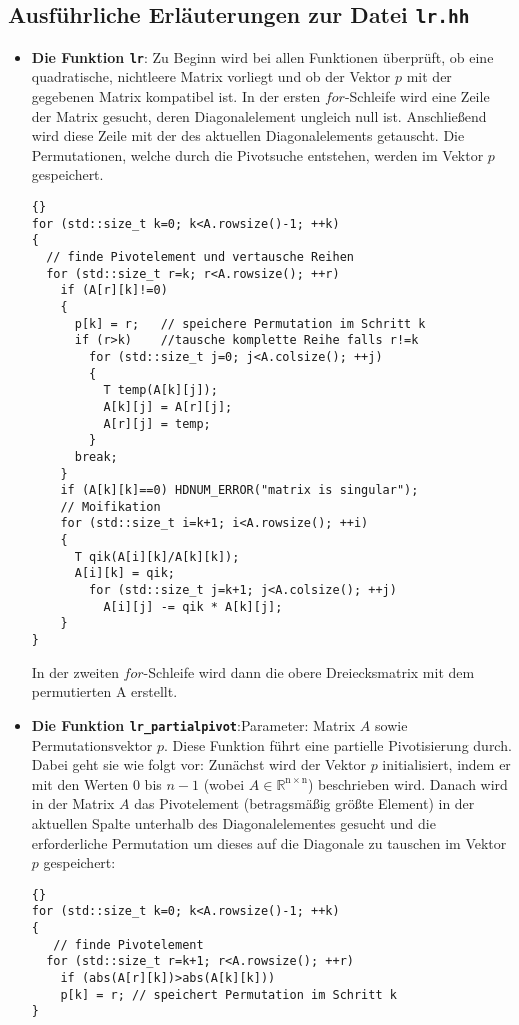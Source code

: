 \documentclass[a4paper,11pt]{article}
\theoremstyle{definition}
\begin{document}
\subsection{Ausführliche Erläuterungen zur Datei \lstinline{lr.hh}}
\begin{itemize}
\item \textbf{Die Funktion \lstinline{lr}}: Zu Beginn wird bei allen
  Funktionen überprüft, ob eine quadratische, nichtleere Matrix
  vorliegt und ob der Vektor $p$ mit der gegebenen Matrix kompatibel
  ist.  In der ersten $for$-Schleife wird eine Zeile der Matrix
  gesucht, deren Diagonalelement ungleich null ist. Anschließend wird
  diese Zeile mit der des aktuellen Diagonalelements getauscht. Die
  Permutationen, welche durch die Pivotsuche entstehen, werden im
  Vektor $p$ gespeichert.

{\footnotesize{\begin{lstlisting}{}
for (std::size_t k=0; k<A.rowsize()-1; ++k)
{
  // finde Pivotelement und vertausche Reihen
  for (std::size_t r=k; r<A.rowsize(); ++r)
    if (A[r][k]!=0)
    {
      p[k] = r;   // speichere Permutation im Schritt k
      if (r>k)    //tausche komplette Reihe falls r!=k
        for (std::size_t j=0; j<A.colsize(); ++j)
        {
          T temp(A[k][j]);
          A[k][j] = A[r][j];
          A[r][j] = temp;
        }
      break;
    }
    if (A[k][k]==0) HDNUM_ERROR("matrix is singular");
    // Moifikation
    for (std::size_t i=k+1; i<A.rowsize(); ++i)
    {
      T qik(A[i][k]/A[k][k]);
      A[i][k] = qik;
        for (std::size_t j=k+1; j<A.colsize(); ++j)
          A[i][j] -= qik * A[k][j];
    }
}
\end{lstlisting}}}

  In der zweiten $for$-Schleife wird dann die obere Dreiecksmatrix mit
  dem permutierten A erstellt.

\item \textbf{Die Funktion \lstinline{lr_partialpivot}}:Parameter:
  Matrix $A$ sowie Permutationsvektor $p$.  Diese Funktion führt eine
  partielle Pivotisierung durch. Dabei geht sie wie folgt vor:
  Zunächst wird der Vektor $p$ initialisiert, indem er mit den Werten
  $0$ bis $n-1$ (wobei
  $A \in \mathbb{R^{\mathrm{n}\times \mathrm{n}}}$) beschrieben
  wird. Danach wird in der Matrix $A$ das Pivotelement (betragsmäßig
  größte Element) in der aktuellen Spalte unterhalb des
  Diagonalelementes gesucht und die erforderliche Permutation um
  dieses auf die Diagonale zu tauschen im Vektor $p$ gespeichert:

{\footnotesize{\begin{lstlisting}{}
for (std::size_t k=0; k<A.rowsize()-1; ++k)
{
   // finde Pivotelement
  for (std::size_t r=k+1; r<A.rowsize(); ++r)
    if (abs(A[r][k])>abs(A[k][k]))
    p[k] = r; // speichert Permutation im Schritt k
}
\end{lstlisting}}}


\end{itemize}
\end{document}
